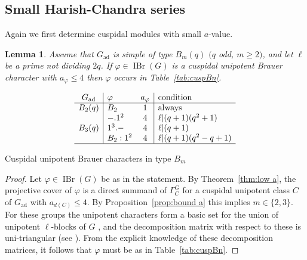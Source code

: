 \documentclass[12pt,leqno,a4paper]{amsart}
\newcommand{\IBr}{{\operatorname{IBr}}}
\newcommand{\ad}{{\operatorname{ad}}}
\let\vhi=\varphi
\newtheorem{lem}[thm]{Lemma}
\theoremstyle{remark}
\begin{document}
\subsection{Small Harish-Chandra series}

Again we first determine cuspidal modules with small $a$-value.

\begin{lem}   \label{lem:cuspBn}
 Assume that $G_\ad$ is simple of type $B_m(q)$ $(q$ odd, $m\ge2)$,
 and let $\ell$ be a prime not dividing $2q$. If $\vhi\in\IBr(G)$ is a
 cuspidal unipotent Brauer character with $a_\vhi\le4$ then $\vhi$ occurs in
 Table~\ref{tab:cuspBn}.
\end{lem}

\begin{table}[ht]
\[\begin{array}{c|lc|l}
 G_\ad& \vhi& a_\vhi& \text{condition}\\
\hline
 B_2(q)&   B_2& 1& \text{always}\\
       & -.1^2& 4& \ell|(q+1)(q^2+1)\\
 B_3(q)& 1^3.-& 4& \ell|(q+1)\\
       & B_2:1^2& 4& \ell|(q+1)(q^2-q+1)\\
\hline
\end{array}\]
\caption{Cuspidal unipotent Brauer characters in type $B_m$}   \label{tab:cuspBn}
\end{table}

\begin{proof}
Let $\vhi\in\IBr(G)$ be as in the statement. By Theorem~\ref{thm:low a},
the projective cover of $\vhi$ is a direct summand of $\Gamma_C^G$ for a
cuspidal unipotent class $C$ of $G_\ad$ with $a_{d(C)}\le4$. By
Proposition~\ref{prop:bound a} this implies $m\in\{2,3\}$.
For these groups the unipotent characters form a basic set for the union of
unipotent $\ell$-blocks of $G$ \cite{Ge93}, and the decomposition matrix with
respect to these is uni-triangular (see \cite{HN14}). From the explicit
knowledge of these decomposition matrices, it follows that $\vhi$ must be as
in Table~\ref{tab:cuspBn}.
\end{proof}
\end{document}
